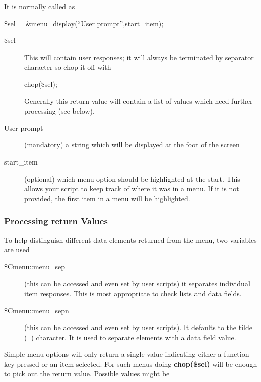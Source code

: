\documentclass[a4paper]{scrartcl}
\begin{document}
It is normally called as

\begin{center}
\$sel = \&menu\_display(``User prompt'',start\_item);
\end{center} 

\begin{description} 
\item [\$sel] This will contain user responses; it will always be terminated by separator character so chop it off with
\begin{center}
chop(\$sel);
\end{center}
Generally this return value will contain a list of values which need further processing (see below).
\item [User prompt] (mandatory) a string which will be displayed at the foot of the screen
\item [start\_item] (optional) which menu option should be highlighted at the start. This allows your script to keep track of where it was in a menu. If it is not provided, the first item in a menu will be highlighted.
\end{description}

\subsubsection{Processing return Values}

To help distinguish different data elements returned from the menu, two variables are used
\begin{description}
\item [\$Cmenu::menu\_sep] (this can be accessed and even set by user scripts) it separates individual item responses. This is most appropriate to check lists and data fields. 

\item [\$Cmenu::menu\_sepn] (this can be accessed and even set by user scripts). It defaults to the tilde (\textbf{~}) character. It is used to separate elements with a data field value.
\end{description}

Simple menu options will only return a single value indicating either a function key pressed or an item selected. For such menus doing \textbf{chop(\$sel)} will be enough to pick out the return value. Possible values might be
\end{document}

